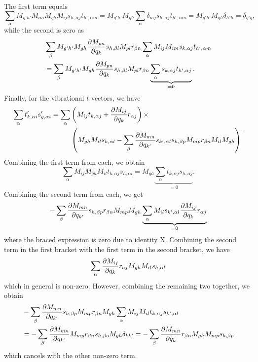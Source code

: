 \documentclass{article}
\begin{document}
The first term equals 
\[
\sum_\alpha M_{g'h'} M_{im} M_{gh} M_{ij} s_{h, \alpha j}t_{h', \alpha m}  = M_{g'h'}M_{gh} \sum_\alpha \delta_{mj} s_{h, \alpha j}t_{h', \alpha m} = M_{g'h'}M_{gh}  \delta_{h'h} = \delta_{g'g},
\]
while the second is zero as
\[
\begin{split}
&\sum_\beta M_{g'h'} M_{gh} \pdv{M_{pn}}{q_{k}} s_{h, \beta l} M_{pl} r_{\beta n} \sum_\alpha M_{ij} M_{im} s_{k, \alpha j} t_{h', \alpha m} \\ &= \sum_\beta M_{g'h'} M_{gh} \pdv{M_{pn}}{q_{k}} s_{h, \beta l} M_{pl} r_{\beta n} \underbrace{\sum_\alpha  s_{k, \alpha j} t_{h', \alpha j}}_{=0}.
\end{split}
\]
Finally, for the vibrational $t$ vectors, we have 
\[
\begin{split}
\sum_\alpha  t'_{k, \alpha i}s'_{g, \alpha i} = \sum_\alpha &\left(M_{ij}t_{k, \alpha j} + \pdv{M_{ij}}{q_{k}}r_{\alpha j} \right) \times \\&\left( M_{gh} M_{il} s_{h, \alpha l} - 
\sum_{\beta} \pdv{M_{mn}}{q_{k'}}s_{k', \alpha l} s_{h, \beta p} M_{mp} r_{\beta n} M_{il}M_{gh}\right)\\
\end{split}.
\]
Combining the first term from each, we obtain
\[
\sum_\alpha M_{ij}M_{gh} M_{il}t_{k,\alpha j}s_{h, \alpha l} =M_{gh}\underbrace{\sum_\alpha t_{k, \alpha j}
s_{h, \alpha j}}_{=0}.
\]
 Combining the second term from each, we get
\[
-\sum_\beta \pdv{M_{mn}}{q_{k'}}s_{h, \beta p} r_{\beta n} M_{mp} M_{gh} \underbrace{\sum_\alpha M_{il} s_{k', \alpha l} \pdv{M_{ij}}{q_k} r_{\alpha j}}_{=0}
\]
where the braced expression is zero due to identity X. Combining the second term in the first bracket with the first term in the second bracket, we have 
\[
\sum_\alpha \pdv{M_{ij}}{q_k}r_{a j} M_{gh} M_{il} s_{h, \alpha l}
\]
which in general is non-zero. However, combining the remaining two together, we obtain
\[
\begin{split}
&-\sum_{\beta} \pdv{M_{mn}}{q_{k'}}s_{h, \beta p} M_{mp}r_{\beta n} M_{gh}\sum_\alpha M_{ij}M_{il} t_{k,\alpha j} s_{k', \alpha l} \\&= -\sum_\beta \pdv{M_{mn}}{q_{k'}}M_{mp}r_{\beta n} s_{h, \beta o} M_{gh} \delta_{kk'} = -\sum_\beta \pdv{M_{mn}}{q_{k}}r_{\beta n} M_{gh}M_{mp} s_{h, \beta p}  \\
\end{split}
\]
which cancels with the other non-zero term.  
\end{document}
